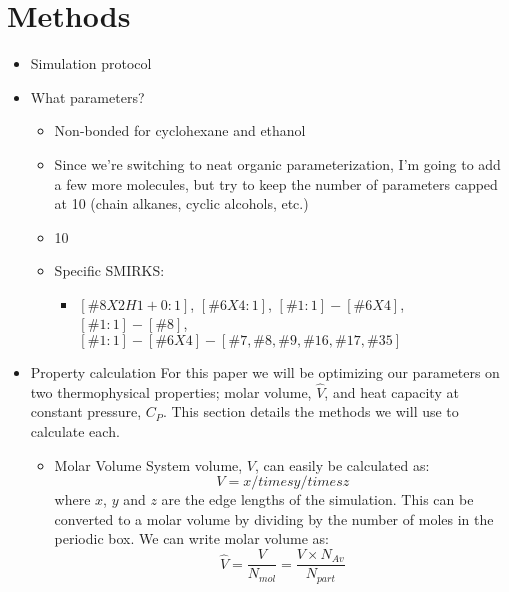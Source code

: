 \documentclass[aps,pre,nofootinbib,superscriptaddress,linenumbers,10pt, draft,tightenlines]{revtex4-1}
\begin{document}
\section{Methods}
\begin{itemize}
	\item Simulation protocol
	\item What parameters?
	\begin{itemize}
		\item Non-bonded for cyclohexane and ethanol 
		\item Since we're switching to neat organic parameterization, I'm going to add a few more molecules,
		      but try to keep the number of parameters capped at 10 (chain alkanes, cyclic alcohols, etc.)
		\item 10
		\item Specific SMIRKS:
		\begin{itemize}
			\item $[\#8X2H1+0:1]$, $[\#6X4:1]$, $[\#1:1]-[\#6X4]$, $[\#1:1]-[\#8]$, 
			      $[\#1:1]-[\#6X4]-[\#7,\#8,\#9,\#16,\#17,\#35]$
		\end{itemize}
	\end{itemize}
    \item Property calculation
    For this paper we will be optimizing our parameters on two thermophysical properties; molar volume, $\hat{V}$, and heat capacity
    at constant pressure, $C_P$. This section details the methods we will use to calculate each.
    \begin{itemize}
    	\item Molar Volume
    	System volume, $V$, can easily be calculated as:
    	\begin{equation} V = x /times y /times z \end{equation}
    	where $x$, $y$ and $z$ are the edge lengths of the simulation.
    	This can be converted to a molar volume by dividing by the number of moles in the periodic box. We can write molar
    	volume as:
    	\begin{equation} \hat{V} = \frac{V}{N_{mol}} = \frac{V \times N_{Av}}{N_{part}} \end{equation}

\end{itemize}
\end{itemize}
\end{document}
